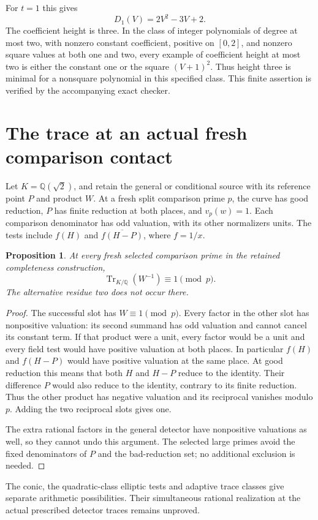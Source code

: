 \documentclass[11pt,a4paper]{article}
\newtheorem{proposition}{Proposition}[section]
\newcommand{\Q}{\mathbb Q}
\begin{document}
For $t=1$ this gives
\[
 \boxed{D_1(V)=2V^2-3V+2.}
\]
The coefficient height is three. In the class of integer polynomials
of degree at most two, with nonzero constant coefficient, positive on
$[0,2]$, and nonzero square values at both one and two, every example
of coefficient height at most two is either the constant one or the
square $(V+1)^2$. Thus height three is minimal for a nonsquare
polynomial in this specified class. This finite assertion is verified
by the accompanying exact checker.

\section{The trace at an actual fresh comparison contact}
Let $K=\Q(\sqrt2)$, and retain the general or conditional source
with its reference point $P$ and product $W$. At a fresh split
comparison prime $p$, the curve has good reduction, $P$ has finite
reduction at both places, and $v_p(w)=1$. Each comparison denominator
has odd valuation, with its other normalizers units. The tests include
$f(H)$ and $\overline{f(H-P)}$, where $f=1/x$.

\begin{proposition}
At every fresh selected comparison prime in the retained completeness
construction,
\[
                 \operatorname{Tr}_{K/\Q}(W^{-1})\equiv1\pmod p.
\]
The alternative residue two does not occur there.
\end{proposition}
\begin{proof}
The successful slot has $W\equiv1\pmod p$. Every factor in the
other slot has nonpositive valuation: its second summand has odd
valuation and cannot cancel its constant term. If that product were
a unit, every factor would be a unit and every field test would have
positive valuation at both places. In particular $f(H)$ and
$f(H-P)$ would have positive valuation at the same place.
At good reduction this means that both $H$ and $H-P$ reduce to the
identity. Their difference $P$ would also reduce to the identity,
contrary to its finite reduction. Thus the other product has negative
valuation and its reciprocal vanishes modulo $p$. Adding the two
reciprocal slots gives one.

The extra rational factors in the general detector have nonpositive
valuations as well, so they cannot undo this argument. The selected
large primes avoid the fixed denominators of $P$ and the bad-reduction
set; no additional exclusion is needed.
\end{proof}

The conic, the quadratic-class elliptic tests and adaptive trace
classes give separate arithmetic possibilities. Their simultaneous
rational realization at the actual prescribed detector traces remains
unproved.
\end{document}
